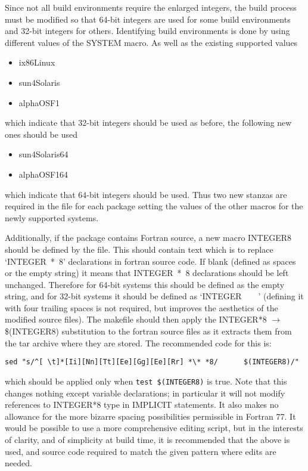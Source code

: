 \documentclass[twoside,11pt]{article}
\renewcommand{\_}{\texttt{\symbol{95}}}
\begin{document}
Since not all build environments require the enlarged integers,
the build process must be modified so that 64-bit integers are
used for some build environments and 32-bit integers for others.
Identifying build environments is done by using different values
of the SYSTEM macro.  As well as the existing supported values
\begin{itemize}
\item ix86\_Linux
\item sun4\_Solaris
\item alpha\_OSF1
\end{itemize}
which indicate that 32-bit integers should be used as before, 
the following new ones should be used
\begin{itemize}
\item sun4\_Solaris\_64
\item alpha\_OSF1\_64
\end{itemize}
which indicate that 64-bit integers should be used.
Thus two new stanzas are required in the  file for each package
setting the values of the other  macros for the newly
supported systems.  

Additionally, if the package contains Fortran source,
a new macro INTEGER8 should be 
defined by the  file.  This should contain text which is to
replace `INTEGER~*~8' declarations in fortran source code.  
If blank (defined as spaces or the empty string) it means 
that INTEGER~*~8 declarations should be left unchanged.
Therefore for 64-bit systems this should be defined as the empty
string, and for 32-bit systems it should be defined as `INTEGER~~~~'
(defining it with four trailing spaces
is not required, but improves the aesthetics of
the modified source files).
The makefile should then apply the INTEGER*8 $\rightarrow$ \$(INTEGER8)
substitution to the fortran source files as it extracts them from the
tar archive where they are stored.
The recommended code for this is:
\begin{squote}
\begin{verbatim}
sed "s/^[ \t]*[Ii][Nn][Tt][Ee][Gg][Ee][Rr] *\* *8/      $(INTEGER8)/"
\end{verbatim}
\end{squote}
which should be applied only when {\tt test \$(INTEGER8)} is true.
Note that this changes nothing except variable declarations; 
in particular it will not modify references to INTEGER*8 type in IMPLICIT
statements.
It also makes no allowance for the more bizarre spacing possibilities
permissible in Fortran 77.
It would be possible to use a more comprehensive editing script,
but in the interests of clarity, and of simplicity at build time,
it is recommended that the above is used, 
and source code required to match the given pattern where edits
are needed.
\end{document}
